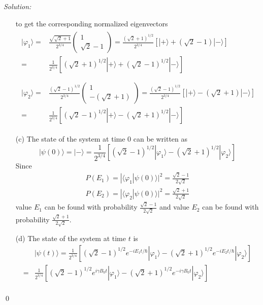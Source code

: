 \documentclass[12pt,a4paper]{article}
\newenvironment{sol}
    {\emph{Solution:}
    }
    {
    \qed
    }
\begin{document}
\begin{sol}
\begin{itemize}
\begin{equation}
\end{equation}
to get the corresponding normalized eigenvectors
\begin{gather}
\begin{align}
\nonumber|\varphi_1\rangle=&\frac{\sqrt{\sqrt{2}+1}}{2^{3/4}}\left(\begin{array}{c}1\\\sqrt{2}-1\end{array}\right)=\frac{(\sqrt{2}+1)^{1/2}}{2^{3/4}}[|+\rangle+(\sqrt{2}-1)|-\rangle]\\
=&\frac{1}{2^{3/4}}[(\sqrt{2}+1)^{1/2}|+\rangle+(\sqrt{2}-1)^{1/2}|-\rangle]\\
\end{align}\\
\begin{align}
\nonumber|\varphi_2\rangle=&\frac{(\sqrt{2}-1)^{1/2}}{2^{3/4}}\left(\begin{array}{c}1\\-(\sqrt{2}+1)\end{array}\right)=\frac{(\sqrt{2}-1)^{1/2}}{2^{3/4}}[|+\rangle-(\sqrt{2}+1)|-\rangle]\\
=&\frac{1}{2^{3/4}}[(\sqrt{2}-1)^{1/2}|+\rangle-(\sqrt{2}+1)^{1/2}|-\rangle]
\end{align}
\end{gather}
\item[(c)] The state of the system at time $0$ can be written as
\begin{equation}
|\psi(0)\rangle=|-\rangle=\frac{1}{2^{3/4}}[(\sqrt{2}-1)^{1/2}|\varphi_1\rangle-(\sqrt{2}+1)^{1/2}|\varphi_2\rangle]
\end{equation}
Since
\begin{gather}
P(E_1)=|\langle\varphi_1|\psi(0)\rangle|^2=\frac{\sqrt{2}-1}{2\sqrt{2}}\\
P(E_2)=|\langle\varphi_2|\psi(0)\rangle|^2=\frac{\sqrt{2}+1}{2\sqrt{2}}
\end{gather}
value $E_1$ can be found with probability $\frac{\sqrt{2}-1}{2\sqrt{2}}$ and value $E_2$ can be found with probability $\frac{\sqrt{2}+1}{2\sqrt{2}}$.
\item[(d)] The state of the system at time $t$ is
\begin{align}
\nonumber&|\psi(t)\rangle=\frac{1}{2^{3/4}}[(\sqrt{2}-1)^{1/2}e^{-iE_1t/\hbar}|\varphi_1\rangle-(\sqrt{2}+1)^{1/2}e^{-iE_2t/\hbar}|\varphi_2\rangle]\\
\nonumber=&\frac{1}{2^{3/4}}[(\sqrt{2}-1)^{1/2}e^{i\gamma B_0t}|\varphi_1\rangle-(\sqrt{2}+1)^{1/2}e^{-i\gamma B_0t}|\varphi_2\rangle]\\

\end{align}
\end{itemize}
\end{sol}
\end{document}

